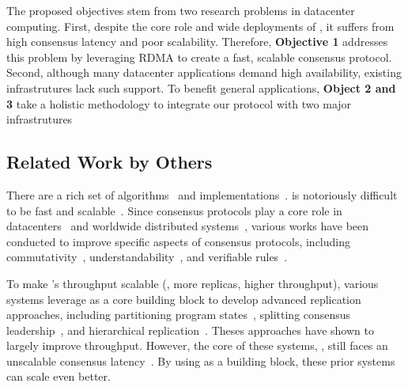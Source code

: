 The proposed objectives stem from two research problems in datacenter 
computing. First, despite the core role and wide deployments of \paxos, it 
suffers from high consensus latency and poor scalability. Therefore, 
\textbf{Objective 1} addresses this problem by leveraging RDMA to create a 
fast, scalable consensus protocol. Second, although many 
datacenter applications demand high availability, existing infrastrutures lack 
such support. To benefit general applications, \textbf{Object 2 and 3} take a 
holistic methodology to integrate our protocol with two major infrastrutures


\vspace{-.15in}\subsection{Related Work by Others} 
\label{sec:others-work}\vspace{-.075in}

There are a rich set of \paxos 
algorithms~\cite{paxos:practical,paxos,paxos:simple,paxos:complex,
epaxos:sosp13} 
and implementations~\cite{paxos:live,paxos:practical,chubby:osdi,crane:sosp15}. 
\paxos is notoriously difficult to be fast and 
scalable~\cite{ellis:thesis,manos:hotdep10,scatter:sosp11}. Since consensus 
protocols play a core role in datacenters~\cite{matei:hotcloud11, mesos:nsdi11, 
datacenter:os} and worldwide 
distributed systems~\cite{spanner:osdi12,mencius:osdi08}, various works 
have been conducted to improve specific aspects of consensus protocols, 
including commutativity~\cite{epaxos:sosp13}, 
understandability~\cite{raft:usenix14,paxos}, and verifiable 
rules~\cite{modist:nsdi09,demeter:sosp11}.

To make \paxos's throughput scalable (\ie, more replicas, higher throughput), 
various systems leverage \paxos as a core building block to develop advanced 
replication approaches, including partitioning program 
states~\cite{scatter:sosp11,ssmr:dsn14}, splitting consensus 
leadership~\cite{mencius:osdi08,spaxos:srds12}, and hierarchical 
replication~\cite{manos:hotdep10,scatter:sosp11}. Theses approaches have shown 
to largely improve throughput. However, the core of these systems, 
\paxos, still faces an unscalable consensus 
latency~\cite{ellis:thesis,scatter:sosp11,manos:hotdep10}. By using \xxx as a 
building block, these prior systems can scale even better.

